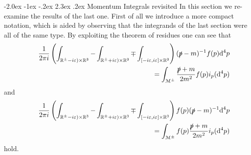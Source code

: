 \documentclass[oneside,reqno,12pt]{amsart}
\makeatletter
\renewcommand\section{\@startsection {section}{1}{\z@}%
                                   {-2.0ex \@plus -1ex \@minus -.2ex}%
                                   {2.3ex \@plus.2ex}%
                                   {\normalfont\Large\bfseries}}
\makeatother
\begin{document}
\section{Momentum Integrals revisited}
In this section we re-examine the results of the last one. First of all we introduce a more compact notation, which is aided by observing that the integrands of the last section were all of the same type. By exploiting the theorem of residues one can see that 
\begin{align}\tag*{}
\frac{1}{2\pi i} 
\left( \int_{\mathbb{R}^{\pm} - i \varepsilon)\times \mathbb{R}^3}
-\int_{\mathbb{R}^\pm + i \varepsilon)\times \mathbb{R}^3} 
\mp \int_{[-i\varepsilon, i \varepsilon] \times \mathbb{R}^3} \right) 
(\slashed{p}-m)^{-1} f(p) \mathrm{d}^4p\\
=\int_{\mathcal{M}^{\pm}} \frac{\slashed{p}+m}{2m^2} f(p) i_p (\mathrm{d}^4p) 
\end{align}
and
\begin{align}\tag*{}
\frac{1}{2\pi i} 
\left( \int_{\mathbb{R}^{\pm} - i \varepsilon)\times \mathbb{R}^3}
-\int_{\mathbb{R}^\pm + i \varepsilon)\times \mathbb{R}^3} 
\mp \int_{[-i\varepsilon, i \varepsilon] \times \mathbb{R}^3} \right) 
f(p) (\slashed{p}-m)^{-1} \mathrm{d}^4p\\
=\int_{\mathcal{M}^{\pm}} f(p) \frac{\slashed{p}+m}{2m^2}  i_p (\mathrm{d}^4p) 
\end{align}
hold. 
\end{document}

